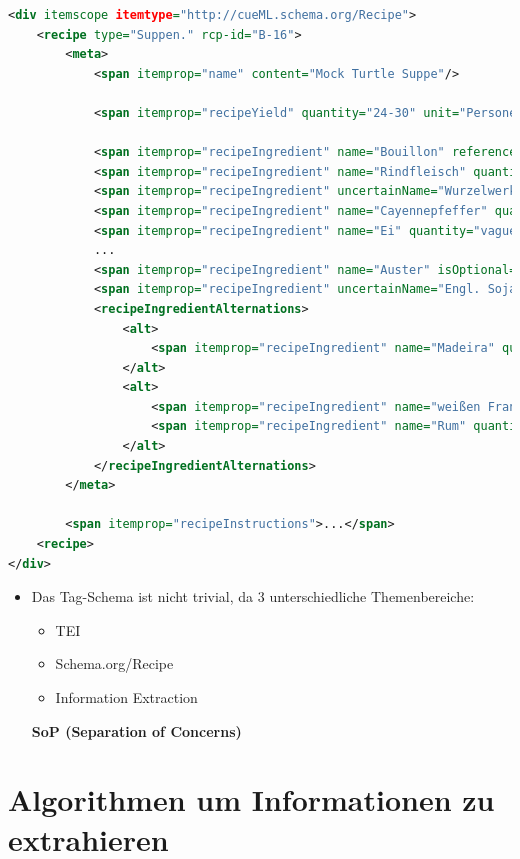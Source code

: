 \documentclass[12pt]{beamer}
\begin{document}
\begin{frame}[fragile]
\begin{lstlisting}[language=XML]
<div itemscope itemtype="http://cueML.schema.org/Recipe">
	<recipe type="Suppen." rcp-id="B-16">
		<meta>
			<span itemprop="name" content="Mock Turtle Suppe"/>
			
			<span itemprop="recipeYield" quantity="24-30" unit="Personen"/>
			
			<span itemprop="recipeIngredient" name="Bouillon" reference="#Bouillon"/>
			<span itemprop="recipeIngredient" name="Rindfleisch" quantity="8-10" unit="Pfund"/>
			<span itemprop="recipeIngredient" uncertainName="Wurzelwerk"/>
			<span itemprop="recipeIngredient" name="Cayennepfeffer" quantity="vague" unit="Messersptize"/>
			<span itemprop="recipeIngredient" name="Ei" quantity="vague"/>
			...
			<span itemprop="recipeIngredient" name="Auster" isOptional="True"/>
			<span itemprop="recipeIngredient" uncertainName="Engl. Soja" quantity="vague" unit="EL" isOptional="True"/>
			<recipeIngredientAlternations>
				<alt>
					<span itemprop="recipeIngredient" name="Madeira" quantity="0.5" unit="Flasche"/>
				</alt>
				<alt>
					<span itemprop="recipeIngredient" name="weißen Franzwein"/>
					<span itemprop="recipeIngredient" name="Rum" quantity="vague"/>
				</alt>
			</recipeIngredientAlternations>
		</meta>
		
		<span itemprop="recipeInstructions">...</span>
	<recipe>
</div>		
\end{lstlisting}
\end{frame}

\begin{frame}
	\begin{itemize}
		\item Das Tag-Schema ist nicht trivial, da 3 unterschiedliche Themenbereiche:
		\begin{itemize}
			\item TEI
			\item Schema.org/Recipe
			\item Information Extraction
		\end{itemize}
		\textbf{SoP (Separation of Concerns)}
	\end{itemize}
\end{frame}

\section{Algorithmen um Informationen zu extrahieren}
\end{document}
